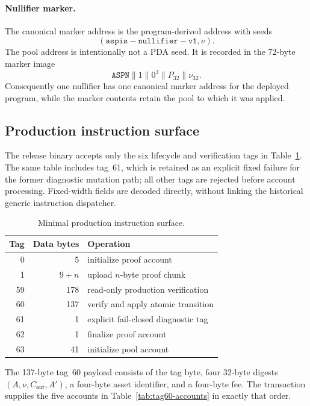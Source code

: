 \paragraph{Nullifier marker.}
The canonical marker address is the program-derived address with seeds
\[
  (\mathtt{aspis-nullifier-v1},\nu).
\]
The pool address is intentionally not a PDA seed.  It is recorded in the
72-byte marker image
\[
  \mathtt{ASPN}\mathbin\|1\mathbin\|0^3
  \mathbin\|P_{32}\mathbin\|\nu_{32}.
\]
Consequently one nullifier has one canonical marker address for the deployed
program, while the marker contents retain the pool to which it was applied.

\subsection{Production instruction surface}
\label{sec:implementation-dispatch}

The release binary accepts only the six lifecycle and verification tags in
Table~\ref{tab:production-tags}.  The same table includes tag~61, which is
retained as an explicit fixed failure for the former diagnostic mutation path;
all other tags are rejected before account processing.  Fixed-width fields are
decoded directly, without linking the historical generic instruction
dispatcher.

\begin{table}[t]
  \centering
  \small
  \caption{Minimal \Profile{} production instruction surface.}
  \label{tab:production-tags}
  \begin{tabular}{r r l}
    \toprule
    Tag & Data bytes & Operation \\
    \midrule
    0  & 5       & initialize proof account \\
    1  & \(9+n\) & upload \(n\)-byte proof chunk \\
    59 & 178     & read-only production verification \\
    60 & 137     & verify and apply atomic transition \\
    61 & 1       & explicit fail-closed diagnostic tag \\
    62 & 1       & finalize proof account \\
    63 & 41      & initialize pool account \\
    \bottomrule
  \end{tabular}
\end{table}

The 137-byte tag~60 payload consists of the tag byte, four 32-byte digests
\((A,\nu,C_{\mathsf{out}},A')\), a four-byte asset identifier, and a four-byte
fee.  The transaction supplies the five accounts in
Table~\ref{tab:tag60-accounts} in exactly that order.

